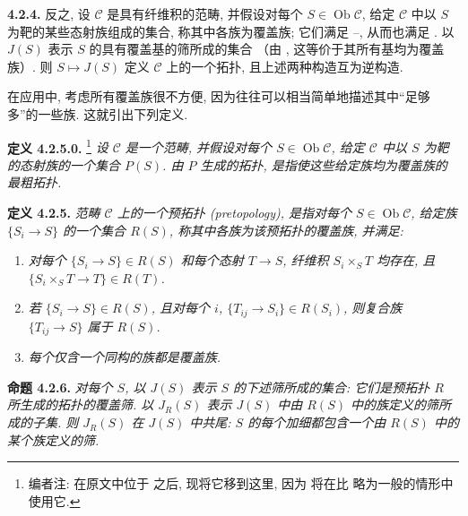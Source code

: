 \medskip
\noindent{}\textbf{4.2.4.}
反之, 设 \(\mathscr C\) 是具有纤维积的范畴,
并假设对每个 \(S\in\operatorname{Ob}\mathscr C\),
给定 \(\mathscr C\) 中以 \(S\) 为靶的某些态射族组成的集合,
称其中各族为覆盖族; 它们满足
--,
从而也满足 .
以 \(J(S)\) 表示 \(S\) 的具有覆盖基的筛所成的集合
（由 ,
这等价于其所有基均为覆盖族）.
则 \(S\mapsto J(S)\) 定义 \(\mathscr C\) 上的一个拓扑,
且上述两种构造互为逆构造.

在应用中, 考虑所有覆盖族很不方便,
因为往往可以相当简单地描述其中“足够多”的一些族.
这就引出下列定义.

\medskip
\noindent{}\textbf{定义 4.2.5.0.}
\footnote{编者注: 在原文中位于
 之后,
现将它移到这里, 因为 
将在比  略为一般的情形中使用它.}
\textit{设 \(\mathscr C\) 是一个范畴,
并假设对每个 \(S\in\operatorname{Ob}\mathscr C\),
给定 \(\mathscr C\) 中以 \(S\) 为靶的态射族的一个集合 \(P(S)\).
\emph{由 \(P\) 生成的拓扑}, 是指使这些给定族均为覆盖族的最粗拓扑.}

\medskip
\noindent{}\textbf{定义 4.2.5.}
\textit{范畴 \(\mathscr C\) 上的一个\emph{预拓扑 (pretopology)},
是指对每个 \(S\in\operatorname{Ob}\mathscr C\), 给定族 \(\{S_i\to S\}\)
的一个集合 \(R(S)\), 称其中各族为\emph{该预拓扑的覆盖族}, 并满足:}
\begin{enumerate}
 \item[(P 1)] \textit{对每个
 \(\{S_i\to S\}\in R(S)\) 和每个态射 \(T\to S\),
 纤维积 \(S_i\times_ST\) 均存在, 且
 \(\{S_i\times_ST\to T\}\in R(T)\).}
 \item[(P 2)] \textit{若
 \(\{S_i\to S\}\in R(S)\), 且对每个 \(i\),
 \(\{T_{ij}\to S_i\}\in R(S_i)\), 则复合族
 \(\{T_{ij}\to S\}\) 属于 \(R(S)\).}
 \item[(P 3)] \textit{每个仅含一个同构的族都是覆盖族.}
\end{enumerate}

\medskip
\noindent{}\textbf{命题 4.2.6.}
\textit{对每个 \(S\), 以 \(J(S)\) 表示 \(S\) 的下述筛所成的集合:
它们是预拓扑 \(R\) 所生成的拓扑的覆盖筛.
以 \(J_R(S)\) 表示 \(J(S)\) 中由 \(R(S)\) 中的族定义的筛所成的子集.
则 \(J_R(S)\) 在 \(J(S)\) 中共尾:
\(S\) 的每个加细都包含一个由 \(R(S)\) 中的某个族定义的筛.}

